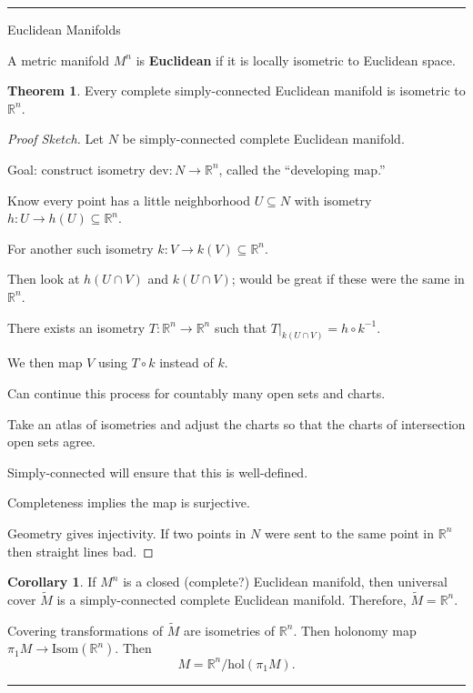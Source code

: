 \documentclass[12pt]{article}
\newcommand{\keyword}[1]{\textbf{#1}}
\newcommand{\sepline}{\rule{\textwidth}{0.4pt}}
\theoremstyle{definition}
\newtheorem{theorem}{Theorem}
\newtheorem{corollary}{Corollary}
\newcommand{\R}{\mathbb{R}}
\newcommand{\<}{\left\langle}
\renewcommand{\>}{\right\rangle}
\newcommand{\seq}{\subseteq}
\newcommand{\Isom}{\mathrm{Isom}}
\begin{document}
\sepline

Euclidean Manifolds

A metric manifold $M^n$ is \keyword{Euclidean} if it is locally isometric to Euclidean space.

\begin{theorem}
    Every complete simply-connected Euclidean manifold is isometric to $\R^n$.
\end{theorem}

\begin{proof}[Proof Sketch]
    Let $N$ be simply-connected complete Euclidean manifold.

    Goal: construct isometry $\mathrm{dev} : N \to \R^n$, called the ``developing map.''

    Know every point has a little neighborhood $U \seq N$ with isometry $h : U \to h(U) \seq \R^n$.

    For another such isometry $k : V \to k(V) \seq \R^n$.

    Then look at $h(U \cap V)$ and $k(U \cap V)$; would be great if these were the same in $\R^n$.

    There exists an isometry $T : \R^n \to \R^n$ such that $T|_{k(U \cap V)} = h \circ k^{-1}$.

    We then map $V$ using $T \circ k$ instead of $k$.

    Can continue this process for countably many open sets and charts.

    Take an atlas of isometries and adjust the charts so that the charts of intersection open sets agree.

    Simply-connected will ensure that this is well-defined.

    Completeness implies the map is surjective.

    Geometry gives injectivity.
    If two points in $N$ were sent to the same point in $\R^n$ then straight lines bad.
\end{proof}

\begin{corollary}
    If $M^n$ is a closed (complete?) Euclidean manifold, then universal cover $\widetilde{M}$ is a simply-connected complete Euclidean manifold.
    Therefore, $\widetilde{M} = \R^n$.
\end{corollary}

Covering transformations of $\widetilde{M}$ are isometries of $\R^n$.
Then holonomy map $\pi_1M \to \Isom(\R^n)$.
Then
\[
    M = \R^n / \mathrm{hol}(\pi_1M).
\]


\sepline
\end{document}
